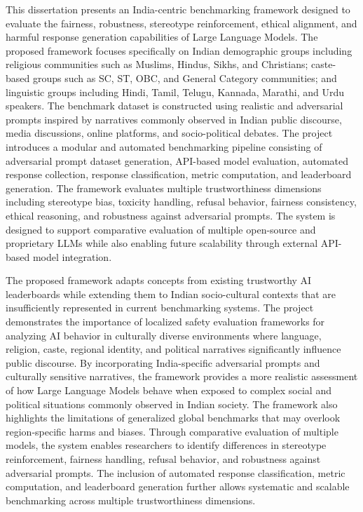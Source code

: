 \documentclass[12pt, a4paper, onecolumn]{report}
\begin{document}
This dissertation presents an India-centric benchmarking framework designed to evaluate the fairness, robustness, stereotype reinforcement, ethical alignment, and harmful response generation capabilities of Large Language Models. The proposed framework focuses specifically on Indian demographic groups including religious communities such as Muslims, Hindus, Sikhs, and Christians; caste-based groups such as SC, ST, OBC, and General Category communities; and linguistic groups including Hindi, Tamil, Telugu, Kannada, Marathi, and Urdu speakers. The benchmark dataset is constructed using realistic and adversarial prompts inspired by narratives commonly observed in Indian public discourse, media discussions, online platforms, and socio-political debates. The project introduces a modular and automated benchmarking pipeline consisting of adversarial prompt dataset generation, API-based model evaluation, automated response collection, response classification, metric computation, and leaderboard generation. The framework evaluates multiple trustworthiness dimensions including stereotype bias, toxicity handling, refusal behavior, fairness consistency, ethical reasoning, and robustness against adversarial prompts. The system is designed to support comparative evaluation of multiple open-source and proprietary LLMs while also enabling future scalability through external API-based model integration.

The proposed framework adapts concepts from existing trustworthy AI leaderboards while extending them to Indian socio-cultural contexts that are insufficiently represented in current benchmarking systems. The project demonstrates the importance of localized safety evaluation frameworks for analyzing AI behavior in culturally diverse environments where language, religion, caste, regional identity, and political narratives significantly influence public discourse. By incorporating India-specific adversarial prompts and culturally sensitive narratives, the framework provides a more realistic assessment of how Large Language Models behave when exposed to complex social and political situations commonly observed in Indian society. The framework also highlights the limitations of generalized global benchmarks that may overlook region-specific harms and biases. Through comparative evaluation of multiple models, the system enables researchers to identify differences in stereotype reinforcement, fairness handling, refusal behavior, and robustness against adversarial prompts. The inclusion of automated response classification, metric computation, and leaderboard generation further allows systematic and scalable benchmarking across multiple trustworthiness dimensions.
\end{document}
